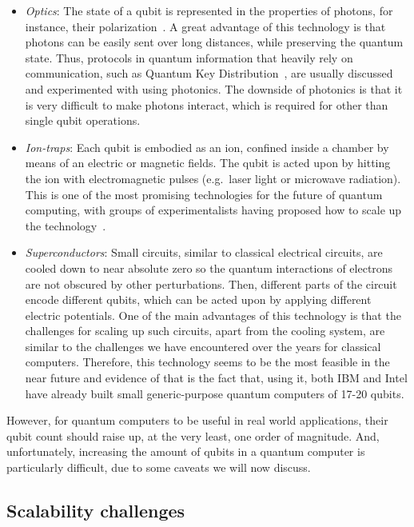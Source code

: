 \begin{itemize}

  \item \textit{Optics}: The state of a qubit is represented in the properties of photons, for instance, their polarization~\citep{OpticsQC}. A great advantage of this technology is that photons can be easily sent over long distances, while preserving the quantum state. Thus, protocols in quantum information that heavily rely on communication, such as Quantum Key Distribution~\citep{QKD}, are usually discussed and experimented with using photonics. The downside of photonics is that it is very difficult to make photons interact, which is required for other than single qubit operations.

  \item \textit{Ion-traps}: Each qubit is embodied as an ion, confined inside a chamber by means of an electric or magnetic fields. The qubit is acted upon by hitting the ion with electromagnetic pulses (e.g.\ laser light or microwave radiation). This is one of the most promising technologies for the future of quantum computing, with groups of experimentalists having proposed how to scale up the technology~\citep{HensingerIonTraps}.

  \item \textit{Superconductors}: Small circuits, similar to classical electrical circuits, are cooled down to near absolute zero so the quantum interactions of electrons are not obscured by other perturbations. Then, different parts of the circuit encode different qubits, which can be acted upon by applying different electric potentials. One of the main advantages of this technology is that the challenges for scaling up such circuits, apart from the cooling system, are similar to the challenges we have encountered over the years for classical computers. Therefore, this technology seems to be the most feasible in the near future and evidence of that is the fact that, using it, both IBM and Intel have already built small generic-purpose quantum computers of 17-20 qubits.

\end{itemize}

However, for quantum computers to be useful in real world applications, their qubit count should raise up, at the very least, one order of magnitude. And, unfortunately, increasing the amount of qubits in a quantum computer is particularly difficult, due to some caveats we will now discuss.


\subsection{Scalability challenges}
\label{Challenges}

